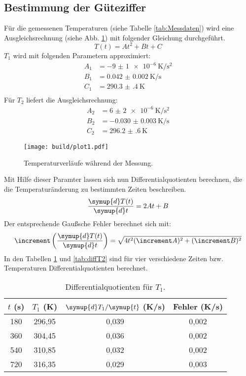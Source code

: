 \subsection{Bestimmung der Güteziffer}
\label{sec:Auswertung_Gueteziffer}

Für die gemessenen Temperaturen (siehe Tabelle \ref{tab:Messdaten}) wird eine Ausgleichsrechnung (siehe Abb. \ref{fig:plot1}) mit folgender Gleichung durchgeführt.
\begin{equation*}
  T(t) = At^2 + Bt + C
\end{equation*}
$T_1$ wird mit folgenden Parametern approximiert:
\begin{align*}
  A_1 &= \SI{-9(1)e-6}{\kelvin\per\second\squared} \\
  B_1 &= \SI{0.042(2)}{\kelvin\per\second} \\
  C_1 &= \SI{290.3(4)}{\kelvin} \\
\end{align*}
Für $T_2$ liefert die Ausgleichsrechnung:
\begin{align*}
  A_2 &= \SI{6(2)e-6}{\kelvin\per\second\squared} \\
  B_2 &= \SI{-0.030(3)}{\kelvin\per\second} \\
  C_2 &= \SI{296.2(6)}{\kelvin}
\end{align*}
\begin{figure}
  \centering
  \texttt{[image: build/plot1.pdf]}
  \caption{Temperaturverläufe während der Messung.}
  \label{fig:plot1}
\end{figure}
\noindent
Mit Hilfe dieser Paramter lassen sich nun Differentialquotienten berechnen, die die Temperaturänderung zu bestimmten Zeiten beschreiben.
\begin{equation*}
  \frac{\symup{d}T(t)}{\symup{d}t} = 2At + B
\end{equation*}
Der entsprechende Gaußsche Fehler berechnet sich mit:
\begin{equation}
  \increment \left(\frac{\symup{d}T(t)}{\symup{d}t} \right) = \sqrt{4 t^2 (\increment A)^2 + (\increment B)^2}
  \label{eqn:gl10}
\end{equation}
In den Tabellen \ref{tab:diffT1} und \ref{tab:diffT2} sind für vier verschiedene Zeiten bzw. Temperaturen Differentialquotienten berechnet.
\begin{table}
  \centering
  \caption{Differentialquotienten für $T_1$.}
  \label{tab:diffT1}
  \begin{tabular}{c c c c}
    \toprule
    $t$ (s) & $T_1$ (K) & $\symup{d}T_1/\symup{t}$ (K/s) & Fehler (K/s) \\
    \midrule
    180 & 296,95 & 0,039 & 0,002 \\
    360 & 304,45 & 0,036 & 0,002 \\
    540 & 310,85 & 0,032 & 0,002 \\
    720 & 316,35 & 0,029 & 0,003 \\
    \bottomrule
  \end{tabular}
\end{table}
